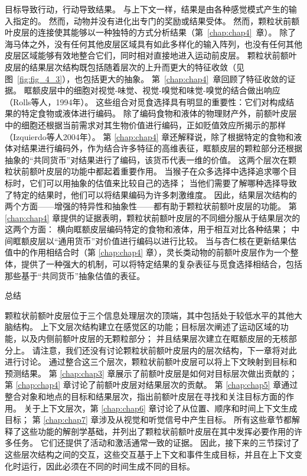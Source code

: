 目标导致行动，行动导致结果。
与上下文一样，结果是由各种感觉模式产生的输入指定的。
然而，动物并没有进化出专门的奖励或结果受体。
然而，颗粒状前额叶皮层的连接使其能够以一种独特的方式分析结果（第~\ref{chap:chap4}~章）。
除了海马体之外，没有任何其他皮层区域具有如此多样化的输入阵列，也没有任何其他皮层区域能够有效地整合它们，同时相对直接地进入运动前皮层。
颗粒状前额叶皮层的结果层次结构既包括随着层次的上升而更大的特征收敛（见图~\ref{fig:fig_4_3}），也包括更大的抽象。
第~\ref{chap:chap4}~章回顾了特征收敛的证据。
眶额皮层中的细胞对视觉-味觉、视觉-嗅觉和味觉-嗅觉的结合做出响应（Rolls等人，1994年）。
这些组合对觅食选择具有明显的重要性：它们对构成结果的特定食物或液体进行编码。
除了编码食物和液体的物理财产外，前额叶皮层中的细胞还根据当前需求对其生物价值进行编码，正如贬值效应所揭示的那样（Izquierdo等人2004年）。
第 \ref{chap:chap4} 章还解释说，除了根据特定的食物和液体对结果进行编码外，作为结合许多特征的高维表征，眶额皮层的颗粒部分还根据抽象的“共同货币”对结果进行了编码，该货币代表一维的价值。
这两个层次在颗粒状前额叶皮层的功能中都起着重要作用。
当猴子在众多选择中选择追求哪个目标时，它们可以用抽象的估值来比较自己的选择；
当他们需要了解哪种选择导致了特定的结果时，他们可以将结果编码为许多刺激维度。
因此，结果层次结构的两个方面——增强的特异性和抽象性——都有助于颗粒状前额叶皮层的功能。
第 \ref{chap:chap4} 章提供的证据表明，颗粒状前额叶皮层的不同细分服从于结果层次的这两个方面：
横向眶额皮层编码特定的食物和液体，用于相互对比各种结果；
中间眶额皮层以“通用货币”对价值进行编码以进行比较。
当与杏仁核在更新结果估值中的作用相结合时（第 \ref{chap:chap4} 章），灵长类动物的前额叶皮层作为一个整体，提供了一种强大的机制，可以将特定结果的复杂表征与觅食选择相结合，包括那些基于“共同货币”抽象估值的表征。



总结

颗粒状前额叶皮层位于三个信息处理层次的顶端，其中包括处于较低水平的其他大脑结构。
上下文层次结构建立在感觉区的功能；目标层次阐述了运动区域的功能，以及内侧前额叶皮层的无颗粒部分；
并且结果层次建立在眶额皮层的无核部分上。
请注意，我们还没有讨论颗粒状前额叶皮层内的层次结构，下一章将对此进行讨论。
通过整合这三个层次，颗粒状前额叶皮层可以将上下文映射到目标和预测结果。
第 \ref{chap:chap3} 章展示了前额叶皮层是如何对目标层次做出贡献的；
第 \ref{chap:chap4} 章讨论了前额叶皮层对结果层次的贡献。
第 \ref{chap:chap5} 章通过整合对象和地点的目标和结果层次，指出前额叶皮层在寻找和关注目标方面的作用。
关于上下文层次，第 \ref{chap:chap6} 章讨论了从位置、顺序和时间上下文生成目标；
第 \ref{chap:chap7} 章涉及从视觉和听觉信号中产生目标。
所有这些章节都解释了这些功能的解剖学基础，并列出了颗粒状前额叶皮层在其中发挥必要作用的许多任务。
它们还提供了活动和激活通常一致的证据。
因此，接下来的三节探讨了这些层次结构之间的交互，这些交互基于上下文和事件生成目标，并且在上下文变化时运行，因此必须在不同的时间生成不同的目标。



